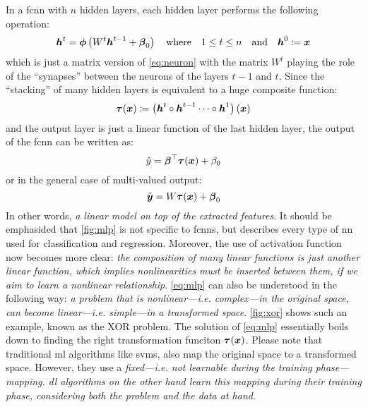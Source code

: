 In a \gls{fcnn} with $n$ hidden layers, each hidden layer performs the following
operation:
\begin{equation}
	\boldsymbol{h}^{t} =
	\boldsymbol{\phi}\left({W^t\boldsymbol{h}^{t-1} + \boldsymbol{\beta}_0}\right)
	\quad
	\text{where}
	\quad
	1 \leq t \leq n
	\quad
	\text{and}
	\quad
	\boldsymbol{h}^0 \coloneqq \boldsymbol{x}
\end{equation}
which is just a matrix version of \Equation{} \ref{eq:neuron} with the matrix $W^t$
playing the role of the ``synapses'' between the
neurons of the layers $t-1$ and $t$. Since the ``stacking'' of
many hidden layers is equivalent to a huge composite function:
\begin{equation}
	\boldsymbol{\tau}(\boldsymbol{x}) \coloneqq
	\left(\boldsymbol{h}^t \circ \boldsymbol{h}^{t-1}
	\cdots
	\circ \boldsymbol{h}^{1}\right)(\boldsymbol{x})
\end{equation}
and the output layer is just a linear function of the last hidden
layer, the output of the \gls{fcnn} can be written as:
\begin{equation}
	\hat{y} =
	\boldsymbol{\beta}^\top \boldsymbol{\tau}(\boldsymbol{x}) + \beta_0
\end{equation}
or in the general case of multi-valued output:
\begin{equation}
	\label{eq:mlp}
	\hat{\boldsymbol{y}} =
	W\boldsymbol{\tau}(\boldsymbol{x}) + \boldsymbol{\beta}_0
\end{equation}
In other words, \emph{a linear model on top of the extracted
features}. It should be emphasided that \Equation{}
\ref{fig:mlp} is not specific to \glspl{fcnn}, but describes every type of
\gls{nn} used for classification and
regression. Moreover, the use of activation function
now becomes more clear: \emph{the composition of many linear functions is
just another linear function, which implies nonlinearities must be inserted
between them, if we aim to learn a nonlinear relationship}. \Equation{}
\ref{eq:mlp} can also be understood in the following way: \emph{a problem that
is nonlinear---i.e. complex---in the original space, can become linear---i.e.
simple---in a transformed space}. \Figure{} \ref{fig:xor} shows such an example,
known as the XOR problem. The solution of \Equation{}
\ref{eq:mlp} essentially boils down to finding the right transformation funciton
$\boldsymbol{\tau}(\boldsymbol{x})$. Please note that traditional \gls{ml} algorithms like
\glspl{svm}, also map the original space to a transformed space. However, they
use a \emph{fixed---i.e. not learnable during the training phase---mapping. \Acrlong{dl} algorithms on the other hand
learn this mapping during their training phase, considering both the problem and
the data at hand}.

